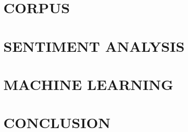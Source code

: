 \documentclass[reqno,12pt,oneside,letter]{report} %
\begin{document}
 \chapter{CORPUS}
 \label{chap:Corpus}
 

 \chapter{SENTIMENT ANALYSIS}
  \label{chap:Sentiment Analysis}
  

 \chapter{MACHINE LEARNING}
 \label{chap:Machine Learning}
 

 \chapter{CONCLUSION}
 \label{chap:Conclusion}
 



\startbibliography
 \begin{singlespace} %
 \end{singlespace}

\startvitapage

\end{document}

